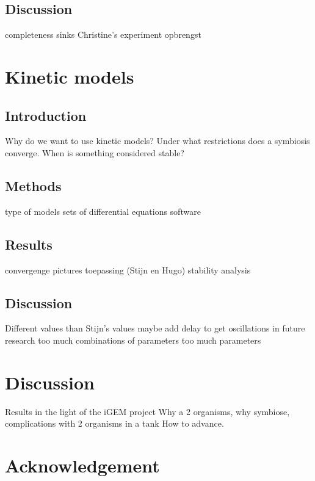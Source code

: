 \documentclass[10pt]{report}
\begin{document}
\section{Discussion}
completeness
sinks
Christine's experiment
opbrengst

\chapter{Kinetic models}

\begin{abstract}
  
\end{abstract}

\section{Introduction}
Why do we want to use kinetic models?
Under what restrictions does a symbiosis converge.
When is something considered stable?

\section{Methods}
type of models
sets of differential equations
software

\section{Results}
convergenge
pictures
toepassing (Stijn en Hugo)
stability analysis

\section{Discussion}
Different values than Stijn's values
maybe add delay to get oscillations in future research
too much combinations of parameters
too much parameters

\chapter{Discussion}
Results in the light of the iGEM project
Why a 2 organisms, why symbiose, complications with 2 organisms in a tank
How to advance.


\chapter{Acknowledgement}
\end{document}
